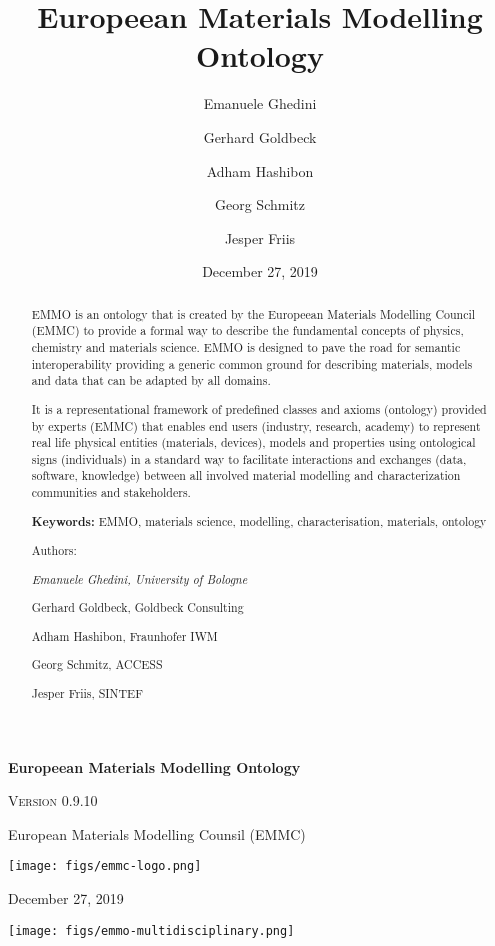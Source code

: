 \documentclass[a4paper,]{report}
\title{Europeean Materials Modelling Ontology}
\author{Emanuele Ghedini \and Gerhard Goldbeck \and Adham Hashibon \and Georg Schmitz \and Jesper Friis}
\institute{European Materials Modelling Counsil (EMMC)}
\date{December 27, 2019}
\begin{document}
\begin{titlepage}
  \centering
      {\huge\bfseries Europeean Materials Modelling Ontology\par}\vspace{0.4cm}
        {\scshape\LARGE Version 0.9.10\par}\vspace{1cm}
    \par
    {\Large European Materials Modelling Counsil (EMMC)\par}\vspace{0.2cm}
    \texttt{[image: figs/emmc-logo.png]}\par\vspace{1cm}
      {\large December 27, 2019\par}\vspace{2cm}
      \texttt{[image: figs/emmo-multidisciplinary.png]}\par\vspace{0.5cm}
  \end{titlepage}
\thispagestyle{empty}
\begin{abstract}
EMMO is an ontology that is created by the Europeean Materials Modelling
Council (EMMC) to provide a formal way to describe the fundamental
concepts of physics, chemistry and materials science. EMMO is designed
to pave the road for semantic interoperability providing a generic
common ground for describing materials, models and data that can be
adapted by all domains.

It is a representational framework of predefined classes and axioms
(ontology) provided by experts (EMMC) that enables end users (industry,
research, academy) to represent real life physical entities (materials,
devices), models and properties using ontological signs (individuals) in
a standard way to facilitate interactions and exchanges (data, software,
knowledge) between all involved material modelling and characterization
communities and stakeholders.
{%
  \par\vspace{1cm}
  {\bf Keywords:} EMMO, materials science, modelling, characterisation, materials, ontology
}
{
  \par\vspace{4cm}
  \raggedleft
  Authors:\par
  \itshape
  Emanuele Ghedini, University of Bologne\par Gerhard Goldbeck, Goldbeck Consulting\par Adham Hashibon, Fraunhofer IWM\par Georg Schmitz, ACCESS\par Jesper Friis, SINTEF\par 
}
\end{abstract}
\end{document}
